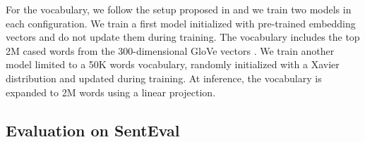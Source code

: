 For the vocabulary, we follow the setup proposed in \textcite{kiros_15, logeswaran_18} and we train two models in each configuration. We train a first model initialized with pre-trained embedding vectors and do not update them during training. The vocabulary includes the top 2M cased words from the 300-dimensional GloVe vectors \parencite{pennington_14}. We train another model limited to a 50K words vocabulary, randomly initialized with a Xavier distribution and updated during training. At inference, the vocabulary is expanded to 2M words using a linear projection.

\subsection{Evaluation on SentEval}

